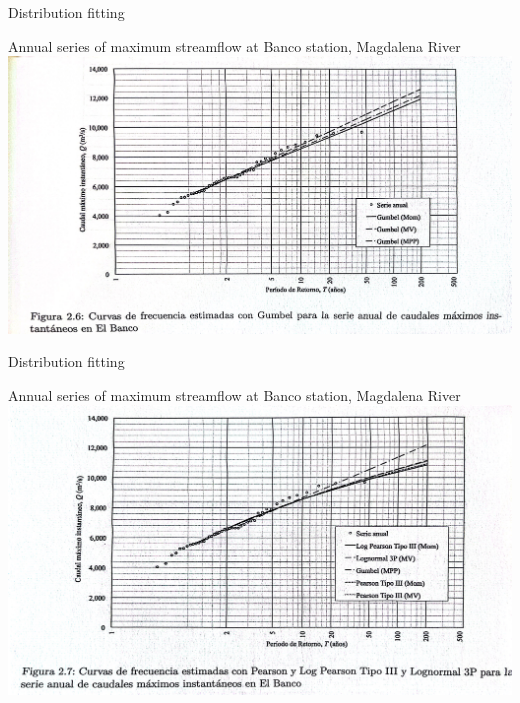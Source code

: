 \documentclass[8pt]{beamer}
\begin{document}
\begin{frame}{Distribution fitting}
  \begin{exampleblock}{Annual series of maximum streamflow at Banco station, Magdalena River} %
\centering
\includegraphics[width=1.0\linewidth]{fiM26.jpg}  %
 \end{exampleblock}
\end{frame}

\begin{frame}{Distribution fitting}
  \begin{exampleblock}{Annual series of maximum streamflow at Banco station, Magdalena River} %
\centering
\includegraphics[width=1.0\linewidth]{fiM27.jpg}  %
 \end{exampleblock}
\end{frame}
\end{document}
